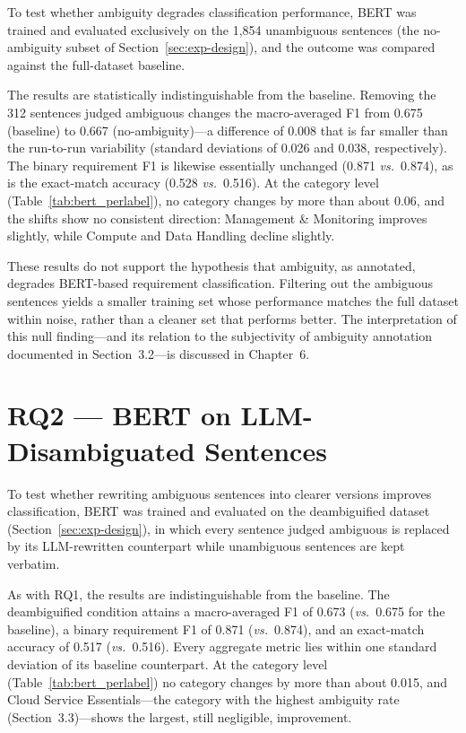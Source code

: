 To test whether ambiguity degrades classification performance, BERT was trained and evaluated exclusively on the 1,854 unambiguous sentences (the no-ambiguity subset of Section~\ref{sec:exp-design}), and the outcome was compared against the full-dataset baseline.

The results are statistically indistinguishable from the baseline. Removing the 312 sentences judged ambiguous changes the macro-averaged F1 from 0.675 (baseline) to 0.667 (no-ambiguity)---a difference of 0.008 that is far smaller than the run-to-run variability (standard deviations of 0.026 and 0.038, respectively). The binary requirement F1 is likewise essentially unchanged (0.871 \textit{vs.}~0.874), as is the exact-match accuracy (0.528 \textit{vs.}~0.516). At the category level (Table~\ref{tab:bert_perlabel}), no category changes by more than about 0.06, and the shifts show no consistent direction: Management \& Monitoring improves slightly, while Compute and Data Handling decline slightly.

These results do not support the hypothesis that ambiguity, as annotated, degrades BERT-based requirement classification. Filtering out the ambiguous sentences yields a smaller training set whose performance matches the full dataset within noise, rather than a cleaner set that performs better. The interpretation of this null finding---and its relation to the subjectivity of ambiguity annotation documented in Section~3.2---is discussed in Chapter~6.

\section{RQ2 --- BERT on LLM-Disambiguated Sentences}

To test whether rewriting ambiguous sentences into clearer versions improves classification, BERT was trained and evaluated on the deambiguified dataset (Section~\ref{sec:exp-design}), in which every sentence judged ambiguous is replaced by its LLM-rewritten counterpart while unambiguous sentences are kept verbatim.

As with RQ1, the results are indistinguishable from the baseline. The deambiguified condition attains a macro-averaged F1 of 0.673 (\textit{vs.}~0.675 for the baseline), a binary requirement F1 of 0.871 (\textit{vs.}~0.874), and an exact-match accuracy of 0.517 (\textit{vs.}~0.516). Every aggregate metric lies within one standard deviation of its baseline counterpart. At the category level (Table~\ref{tab:bert_perlabel}) no category changes by more than about 0.015, and Cloud Service Essentials---the category with the highest ambiguity rate (Section~3.3)---shows the largest, still negligible, improvement.

